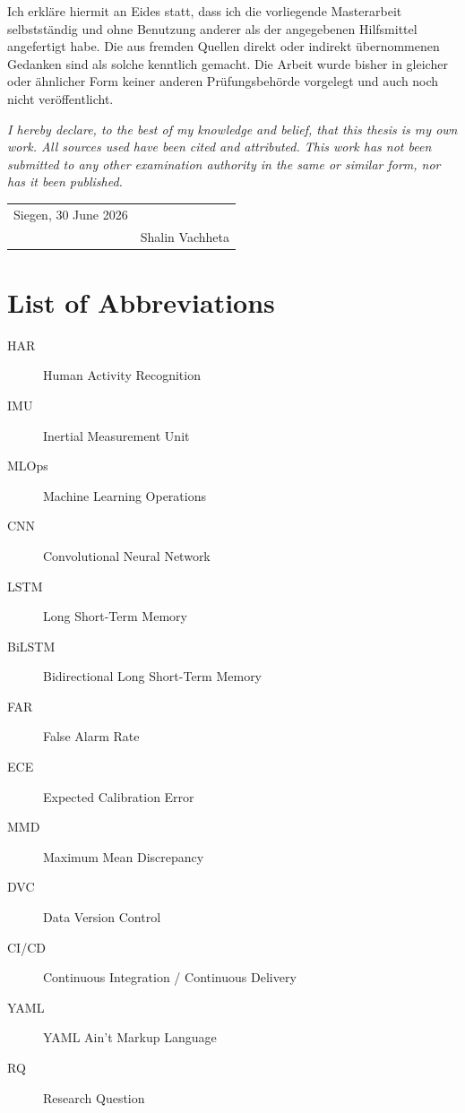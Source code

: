 \documentclass[12pt,a4paper,oneside]{report}
\begin{document}
Ich erkl\"are hiermit an Eides statt, dass ich die vorliegende Masterarbeit selbstst\"andig und ohne Benutzung anderer als der angegebenen Hilfsmittel angefertigt habe. Die aus fremden Quellen direkt oder indirekt \"ubernommenen Gedanken sind als solche kenntlich gemacht. Die Arbeit wurde bisher in gleicher oder \"ahnlicher Form keiner anderen Pr\"ufungsbeh\"orde vorgelegt und auch noch nicht ver\"offentlicht.

\bigskip
\noindent
\textit{I hereby declare, to the best of my knowledge and belief, that this thesis is my own work. All sources used have been cited and attributed. This work has not been submitted to any other examination authority in the same or similar form, nor has it been published.}

\vspace{2.5cm}

\noindent
\begin{tabular}{p{5cm}p{6cm}}
  Siegen, 30 June 2026 & \hrulefill \\
                       & Shalin Vachheta \\
\end{tabular}

\clearpage
\tableofcontents

\clearpage
{}
{}
\listoffigures

\clearpage
{}
{}
\listoftables

\clearpage
{}
\chapter*{List of Abbreviations}

\begin{description}
  \item[HAR] Human Activity Recognition
  \item[IMU] Inertial Measurement Unit
  \item[MLOps] Machine Learning Operations
  \item[CNN] Convolutional Neural Network
  \item[LSTM] Long Short-Term Memory
  \item[BiLSTM] Bidirectional Long Short-Term Memory
  \item[FAR] False Alarm Rate
  \item[ECE] Expected Calibration Error
  \item[MMD] Maximum Mean Discrepancy
  \item[DVC] Data Version Control
  \item[CI/CD] Continuous Integration / Continuous Delivery
  \item[YAML] YAML Ain't Markup Language
  \item[RQ] Research Question
\end{description}
\end{document}
